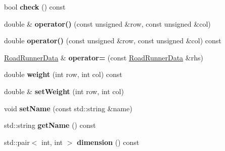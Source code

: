 \begin{DoxyCompactItemize}
\item 
\hypertarget{classrr_1_1_road_runner_data_a1bc71340d893f1fc39c1fc6e9d385540}{bool {\bfseries check} () const }\label{classrr_1_1_road_runner_data_a1bc71340d893f1fc39c1fc6e9d385540}

\item 
\hypertarget{classrr_1_1_road_runner_data_a1570070ebc8b338bf8abcbfd3438027b}{double \& {\bfseries operator()} (const unsigned \&row, const unsigned \&col)}\label{classrr_1_1_road_runner_data_a1570070ebc8b338bf8abcbfd3438027b}

\item 
\hypertarget{classrr_1_1_road_runner_data_a378176fb75b3dbd5eacd330d1e2cb8d7}{double {\bfseries operator()} (const unsigned \&row, const unsigned \&col) const }\label{classrr_1_1_road_runner_data_a378176fb75b3dbd5eacd330d1e2cb8d7}

\item 
\hypertarget{classrr_1_1_road_runner_data_a55e9129f9943104f74d7e273e001d3c4}{\hyperlink{classrr_1_1_road_runner_data}{Road\-Runner\-Data} \& {\bfseries operator=} (const \hyperlink{classrr_1_1_road_runner_data}{Road\-Runner\-Data} \&rhs)}\label{classrr_1_1_road_runner_data_a55e9129f9943104f74d7e273e001d3c4}

\item 
\hypertarget{classrr_1_1_road_runner_data_a67ee75600f3c719cea51fcc89f0415ca}{double {\bfseries weight} (int row, int col) const }\label{classrr_1_1_road_runner_data_a67ee75600f3c719cea51fcc89f0415ca}

\item 
\hypertarget{classrr_1_1_road_runner_data_a64511ab547a21c844a944e3571378589}{double \& {\bfseries set\-Weight} (int row, int col)}\label{classrr_1_1_road_runner_data_a64511ab547a21c844a944e3571378589}

\item 
\hypertarget{classrr_1_1_road_runner_data_ad50eae194274efde23f2d9635bbed64e}{void {\bfseries set\-Name} (const std\-::string \&name)}\label{classrr_1_1_road_runner_data_ad50eae194274efde23f2d9635bbed64e}

\item 
\hypertarget{classrr_1_1_road_runner_data_ac7d41e88e4876916be83183eca827e03}{std\-::string {\bfseries get\-Name} () const }\label{classrr_1_1_road_runner_data_ac7d41e88e4876916be83183eca827e03}

\item 
\hypertarget{classrr_1_1_road_runner_data_a352413ce43d3865e1ea5b00e8e336bf1}{std\-::pair$<$ int, int $>$ {\bfseries dimension} () const }\label{classrr_1_1_road_runner_data_a352413ce43d3865e1ea5b00e8e336bf1}


\end{DoxyCompactItemize}
